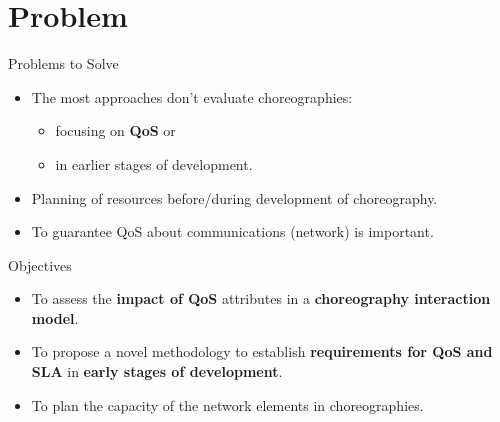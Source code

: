 \documentclass[xcolor=svgnames]{beamer}
\begin{document}
\section{Problem}

    \begin{frame}{Problems to Solve}
    	\begin{itemize}
          \item <1-> The most approaches don't evaluate choreographies:
	    \begin{itemize}
	      \item focusing on \textbf{QoS} or
	      \item in earlier stages of development.
	    \end{itemize}

          \item <2-> Planning of resources before/during development of choreography.
          \item <3-> To guarantee QoS about communications (network) is important.
    	\end{itemize}
    \end{frame}

    \begin{frame}
        \begin{block}{Objectives }\vspace{-.3\baselineskip}
        	\begin{itemize}
                  \item To assess the \textbf{impact of QoS} attributes in a \textbf{choreography interaction model}.
		  \item To propose a novel methodology to establish \textbf{requirements for QoS and SLA} in \textbf{early stages of development}.
		  \item To plan the capacity of the network elements in choreographies.
            \end{itemize}
        \end{block}
    \end{frame}



\end{document}
